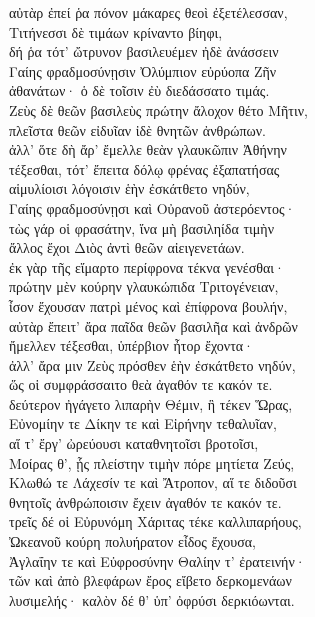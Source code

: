 \begin{pages}
\begin{Leftside}
αὐτὰρ ἐπεί ῥα πόνον μάκαρες θεοὶ ἐξετέλεσσαν, \\
Τιτήνεσσι δὲ τιμάων κρίναντο βίηφι,\\
δή ῥα τότ' ὤτρυνον βασιλευέμεν ἠδὲ ἀνάσσειν\\
Γαίης φραδμοσύνῃσιν Ὀλύμπιον εὐρύοπα Ζῆν\\
ἀθανάτων· ὁ δὲ τοῖσιν ἐὺ διεδάσσατο τιμάς. \\

\quad{}Ζεὺς δὲ θεῶν βασιλεὺς πρώτην ἄλοχον θέτο Μῆτιν, \\
πλεῖστα θεῶν εἰδυῖαν ἰδὲ θνητῶν ἀνθρώπων. \\
ἀλλ' ὅτε δὴ ἄρ' ἔμελλε θεὰν γλαυκῶπιν Ἀθήνην\\
τέξεσθαι, τότ' ἔπειτα δόλῳ φρένας ἐξαπατήσας\\
αἱμυλίοισι λόγοισιν ἑὴν ἐσκάτθετο νηδύν,  \\
Γαίης φραδμοσύνῃσι καὶ Οὐρανοῦ ἀστερόεντος· \\
τὼς γάρ οἱ φρασάτην, ἵνα μὴ βασιληίδα τιμὴν\\
ἄλλος ἔχοι Διὸς ἀντὶ θεῶν αἰειγενετάων.\\
ἐκ γὰρ τῆς εἵμαρτο περίφρονα τέκνα γενέσθαι· \\
πρώτην μὲν κούρην γλαυκώπιδα Τριτογένειαν, \\
ἶσον ἔχουσαν πατρὶ μένος καὶ ἐπίφρονα βουλήν,\\
αὐτὰρ ἔπειτ' ἄρα παῖδα θεῶν βασιλῆα καὶ ἀνδρῶν\\
ἤμελλεν τέξεσθαι, ὑπέρβιον ἦτορ ἔχοντα·\\
ἀλλ' ἄρα μιν Ζεὺς πρόσθεν ἑὴν ἐσκάτθετο νηδύν,\\
ὥς οἱ συμφράσσαιτο θεὰ ἀγαθόν τε κακόν τε. \\

\quad{}δεύτερον ἠγάγετο λιπαρὴν Θέμιν, ἣ τέκεν Ὥρας,\\
Εὐνομίην τε Δίκην τε καὶ Εἰρήνην τεθαλυῖαν,\\
αἵ τ' ἔργ' ὠρεύουσι καταθνητοῖσι βροτοῖσι,\\
Μοίρας θ', ᾗς πλείστην τιμὴν πόρε μητίετα Ζεύς, \\
Κλωθώ τε Λάχεσίν τε καὶ Ἄτροπον, αἵ τε διδοῦσι  \\
θνητοῖς ἀνθρώποισιν ἔχειν ἀγαθόν τε κακόν τε.\\

\quad{}τρεῖς δέ οἱ Εὐρυνόμη Χάριτας τέκε καλλιπαρήους,\\
Ὠκεανοῦ κούρη πολυήρατον εἶδος ἔχουσα,\\
Ἀγλαΐην τε καὶ Εὐφροσύνην Θαλίην τ' ἐρατεινήν·\\
τῶν καὶ ἀπὸ βλεφάρων ἔρος εἴβετο δερκομενάων \\
λυσιμελής· καλὸν δέ θ' ὑπ' ὀφρύσι δερκιόωνται. \\


\end{Leftside}
\end{pages}
